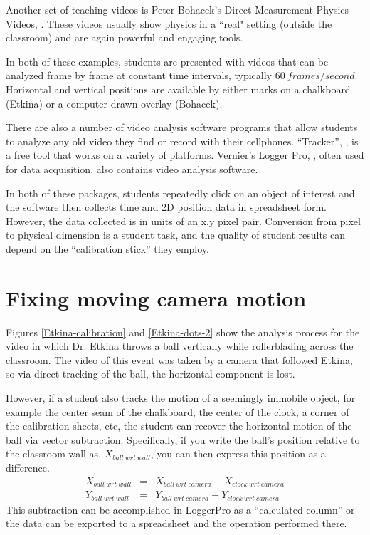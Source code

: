 \documentclass[12pt]{iopart}
\newcommand{\bea}{\begin{eqnarray}}
\newcommand{\eea}{\end{eqnarray}}
\begin{document}
Another set of teaching videos is Peter Bohacek's Direct Measurement Physics Videos, \cite{Bohacek_overview} .
These videos usually show physics in a ``real" setting (outside the classroom) and are again powerful and engaging tools.  

In both of these examples, students are presented with videos that can be analyzed frame by frame at constant time intervals, typically $60~frames/second$.  Horizontal and vertical positions are available by either marks on a chalkboard (Etkina) or a computer drawn overlay (Bohacek).  

There are also a number of video analysis software programs that allow students to analyze any old video they find or record with their cellphones.  ``Tracker'', \cite{Tracker}, is a free tool that works on a variety of platforms. Vernier's Logger Pro, \cite{LoggerPro}, often used for data acquisition, also contains video analysis software.  

In both of these packages, students repeatedly click on an object of interest and the software then collects time and 2D position data  in spreadsheet form.  However, the data collected is in units of an x,y pixel pair.  Conversion from pixel to physical dimension is a student task, and the quality of student results can depend on the ``calibration stick''\cite{calibration_stick} they employ.

\section{Fixing moving camera motion} 
Figures \ref{Etkina-calibration} and \ref{Etkina-dots-2} show the analysis process for the video in which Dr. Etkina throws a ball vertically while rollerblading across the classroom.  The video of this event was taken by a camera that followed Etkina, so via direct tracking of the ball, the horizontal component is lost.

However, if a student also tracks the motion of a seemingly immobile object, for example the center seam of the chalkboard, the center of the clock, a corner of the calibration sheets, etc, the student can recover the horizontal motion of the ball via vector subtraction.  Specifically, if you write  the ball's position relative to the classroom wall as, $X_{ball~wrt~wall}$, you can then express this position as a difference.
\bea
X_{ball~wrt~wall} &=& X_{ball~wrt~camera}-X_{clock~wrt~camera} \nonumber\\ 
Y_{ball~wrt~wall} &=& Y_{ball~wrt~camera}-Y_{clock~wrt~camera}\nonumber
\eea
This subtraction can be accomplished in LoggerPro as a ``calculated column'' or the data can be exported to a spreadsheet and the operation performed there.  
\end{document}
